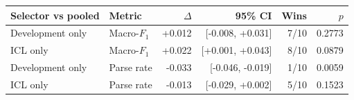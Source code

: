 \begin{tabular}{@{}llrrrr@{}}
\toprule
Selector vs pooled & Metric & $\Delta$ & 95\% CI & Wins & $p$ \\
\midrule
Development only & Macro-$F_1$ & +0.012 & [-0.008, +0.031] & 7/10 & 0.2773 \\
ICL only & Macro-$F_1$ & +0.022 & [+0.001, +0.043] & 8/10 & 0.0879 \\
Development only & Parse rate & -0.033 & [-0.046, -0.019] & 1/10 & 0.0059 \\
ICL only & Parse rate & -0.013 & [-0.029, +0.002] & 5/10 & 0.1523 \\
\bottomrule
\end{tabular}